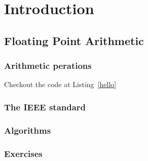 \chapter{Introduction}\label{chp:introduction}

\section{Floating Point Arithmetic}\label{sec:floating-point-arithmetic}

% 



\subsection{Arithmetic perations}

Checkout the code at Listing~\ref{hello}

\subsection{The IEEE standard}

\subsection{Algorithms}

\subsection{Exercises}
